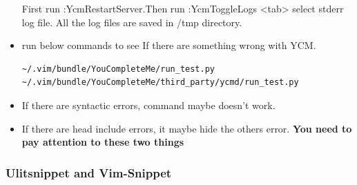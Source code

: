 \documentclass[a4paper,12pt,twoside]{book}
\begin{document}
\begin{itemize}
First run :YcmRestartServer.Then run :YcmToggleLogs <tab> select stderr log file. All the log files are saved in /tmp directory. 

\item run below commands to see If there are something wrong with YCM. 	
\begin{verbatim}
~/.vim/bundle/YouCompleteMe/run_test.py
~/.vim/bundle/YouCompleteMe/third_party/ycmd/run_test.py
\end{verbatim}
\item If there are syntactic errors, \gg command maybe doesn't work. 
\item If there are head include errors, it maybe hide the others error. \textbf{You need to pay attention to these two things}
\end{itemize}

\subsubsection{Ulitsnippet and Vim-Snippet}
\end{document}
